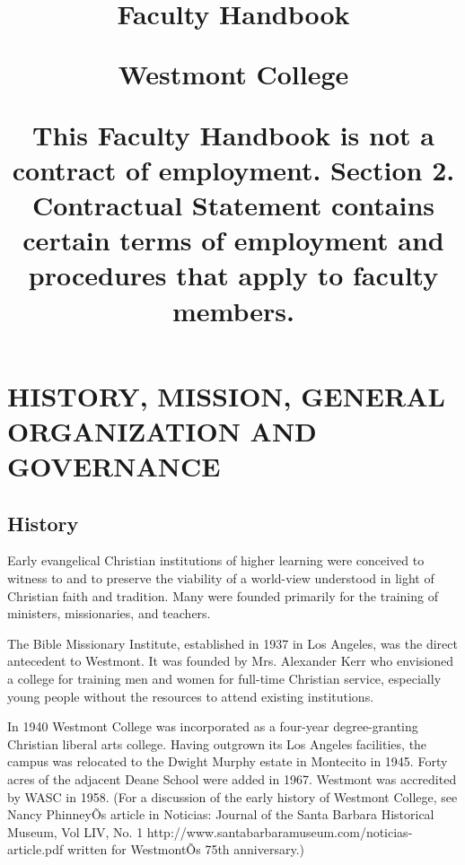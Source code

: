 \documentclass[letterpaper, 11pt]{article}
\date{}
\author{}
\title{\vspace*{2in} {\bfseries

Faculty Handbook

 Westmont College}
 
   
   This Faculty Handbook is not a contract of employment.
   Section 2. Contractual Statement contains 
certain terms of employment and procedures 
that apply to faculty members.
  
  
}
\begin{document}
\fancyhf{} %
\cfoot{\bf -- \thepage\ --}

\renewcommand{\contentsname}{Table of Contents}

\maketitle

\thispagestyle{empty}

\clearpage

\tableofcontents


\setcounter{page}{1}

\clearpage



\setcounter{page}{1} 

\section{HISTORY, MISSION, GENERAL ORGANIZATION AND GOVERNANCE}
\subsection{History}

   Early evangelical Christian institutions of higher learning were conceived to witness to and to preserve the viability of a world-view understood in light of Christian faith and tradition. Many were founded primarily for the training of ministers, missionaries, and teachers.

   The Bible Missionary Institute, established in 1937 in Los Angeles, was the direct antecedent to Westmont. It was founded by Mrs. Alexander Kerr who envisioned a college for training men and women for full-time Christian service, especially young people without the resources to attend existing institutions.

   In 1940 Westmont College was incorporated as a four-year degree-granting Christian liberal arts college. Having outgrown its Los Angeles facilities, the campus was relocated to the Dwight Murphy estate in Montecito in 1945. Forty acres of the adjacent Deane School were added in 1967. Westmont was accredited by WASC in 1958. (For a discussion of the early history of Westmont College, see Nancy PhinneyÕs article in Noticias: Journal of the Santa Barbara Historical Museum, Vol LIV, No. 1 http://www.santabarbaramuseum.com/noticias-article.pdf written for WestmontÕs 75th anniversary.)
\end{document}
